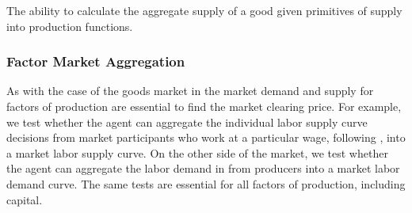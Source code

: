 


\begin{el}
    {The ability to calculate the aggregate supply of a good given primitives of supply into production functions.}
\end{el}

\subsubsection{Factor Market Aggregation}\label{mod:factor_aggregation}
As with the case of the goods market in  the market demand and supply for factors of production are essential to find the market clearing price.  For example, we test whether the agent can aggregate the individual labor supply curve decisions from market participants who work at a particular wage, following , into a market labor supply curve.  On the other side of the market, we test whether the agent can aggregate the labor demand in  from producers into a market labor demand curve.  The same tests are essential for all factors of production, including capital.


